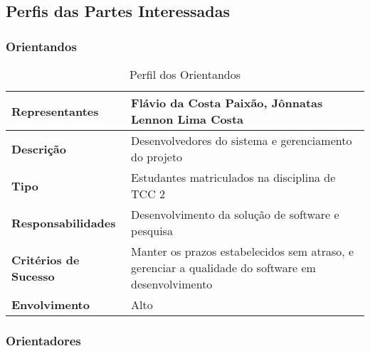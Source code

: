 \begin{anexosenv}
\subsection{Perfis das Partes Interessadas}

\subsubsection{Orientandos}

    \begin{table}[]
        \centering
        \caption{Perfil dos Orientandos}
        \begin{tabular}{@{}|l|l|@{}}
        \toprule
        \textbf{Representantes}       & Flávio da Costa Paixão, Jônnatas Lennon Lima Costa                                                \\ \midrule
        \textbf{Descrição}            & Desenvolvedores do sistema e gerenciamento do projeto                                             \\ \midrule
        \textbf{Tipo}                 & Estudantes matriculados na disciplina de TCC 2                                                    \\ \midrule
        \textbf{Responsabilidades}    & Desenvolvimento da solução de software e pesquisa                                                 \\ \midrule
        \textbf{Critérios de Sucesso} & Manter os prazos estabelecidos sem atraso, e gerenciar a qualidade do software em desenvolvimento \\ \midrule
        \textbf{Envolvimento}         & Alto                                                                                              \\ \bottomrule
        \end{tabular}
        \label{table:Perfil dos Orientandos}
    \end{table}

\subsubsection{Orientadores}


\end{anexosenv}
